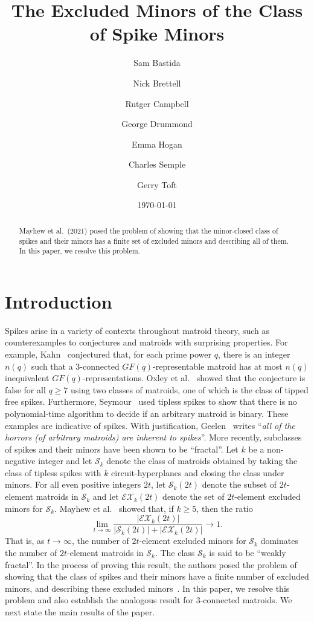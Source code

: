 \documentclass[11pt]{amsart}
\title[The Excluded Minors of Spike Minors]{The Excluded Minors of the Class of Spike Minors}
\author[S.\ Bastida, N.\ Brettell, R.\ Campbell et al.]{Sam Bastida \and Nick Brettell \and Rutger Campbell \and George Drummond \and Emma Hogan \and Charles Semple \and Gerry Toft}
\date{\today}
\numberwithin{equation}{section} %
\newcommand{\cS}{\mathcal{S}}
\begin{document}
\maketitle

\begin{abstract}
Mayhew et al.\ (2021) posed the problem of showing that the minor-closed class of spikes and their minors has a finite set of excluded minors and describing all of them. In this paper, we resolve this problem.
\end{abstract}
	
\section{Introduction}	

Spikes arise in a variety of contexts throughout matroid theory, such as counterexamples to conjectures and matroids with surprising properties. For example, Kahn~\cite{kah88} conjectured that, for each prime power $q$, there is an integer $n(q)$ such that a $3$-connected $GF(q)$-representable matroid has at most $n(q)$ inequivalent $GF(q)$-representations. Oxley et al.~\cite{ox96} showed that the conjecture is false for all $q\ge 7$ using two classes of matroids, one of which is the class of tipped free spikes. Furthermore, Seymour~\cite{sey81} used tipless spikes to show that there is no polynomial-time algorithm to decide if an arbitrary matroid is binary. These examples are indicative of spikes. With justification, Geelen~\cite{gee08} writes ``{\em all of the horrors {\rm (of arbitrary matroids)} are inherent to spikes}''. More recently, subclasses of spikes and their minors have been shown to be ``fractal''.  Let $k$ be a non-negative integer and let $\cS_k$ denote the class of matroids obtained by taking the class of tipless spikes with $k$ circuit-hyperplanes and closing the class under minors. For all even positive integers $2t$, let $\cS_k(2t)$ denote the subset of $2t$-element matroids in $\cS_k$ and let $\mathcal E\mathcal X_k(2t)$ denote the set of $2t$-element excluded minors for $\cS_k$. Mayhew et al.~\cite{may21} showed that, if $k\ge 5$, then the ratio
$$\lim_{t\rightarrow \infty}\frac{|\mathcal E\mathcal X_k(2t)|}{|\cS_k(2t)|+|\mathcal E\mathcal X_k(2t)|}\rightarrow 1.$$
That is, as $t\rightarrow \infty$, the number of $2t$-element excluded minors for $\cS_k$ dominates the number of $2t$-element matroids in $\cS_k$. The class $\cS_k$ is said to be ``weakly fractal''. In the process of proving this result, the authors posed the problem of showing that the class of spikes and their minors have a finite number of excluded minors, and describing these excluded minors~\cite[Problem~3.11]{may21}. In this paper, we resolve this problem and also establish the analogous result for $3$-connected matroids. We next state the main results of the paper.
\end{document}
